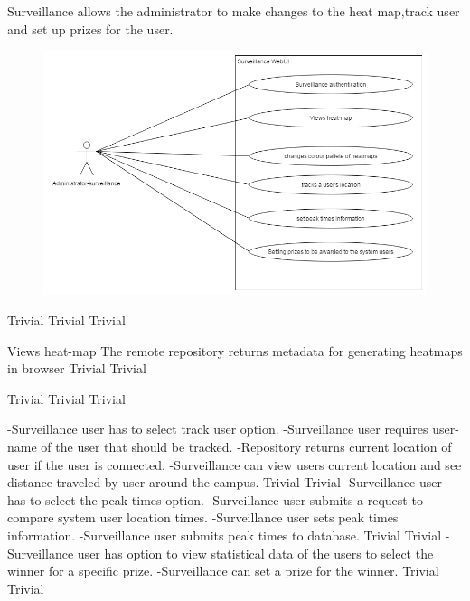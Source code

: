 Surveillance allows the administrator to make changes to the heat map,track user and set up prizes for the user.
\mbox{}\\
\begin{figure}[h]
  \includegraphics[width=\textwidth]{diagrams/Specific_Requirements/surveillance_webUI.png}
\end{figure}

 		{Trivial}
    {Trivial}
    {Trivial}

\FuncReq
    { Views heat-map}
		{The remote repository returns metadata for generating heatmaps in browser}
    {Trivial}
    {Trivial}

		{Trivial}
    {Trivial}
    {Trivial}
	
		{-Surveillance user has to select track user option.
		-Surveillance user requires user-name of the user that should be tracked.
		-Repository returns current location of user if the user is connected.
		-Surveillance can view users current location and see distance traveled by user around the campus.}
    {Trivial}
    {Trivial}
		{-Surveillance user has to select the peak times option.
		-Surveillance user submits a request to compare system user location times.
		-Surveillance user sets peak times information.
		-Surveillance user submits peak times to database.}
    {Trivial}
    {Trivial}
		{-Surveillance user has option to view statistical data of the users to select the winner for a specific prize.
		 -Surveillance can set a prize for the winner.}
    {Trivial}
    {Trivial}
